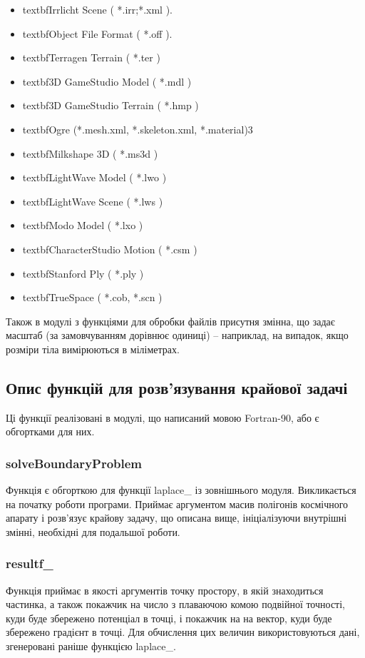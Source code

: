 \documentclass[a4paper,12pt]{article}
\begin{document}
\begin{itemize}
 \item textbf{Irrlicht Scene} ( *.irr;*.xml ).
 \item textbf{Object File Format} ( *.off ).
 \item textbf{Terragen Terrain} ( *.ter )
 \item textbf{3D GameStudio Model} ( *.mdl )
 \item textbf{3D GameStudio Terrain} ( *.hmp )
 \item textbf{Ogre} (*.mesh.xml, *.skeleton.xml, *.material)3
 \item textbf{Milkshape 3D} ( *.ms3d )
 \item textbf{LightWave Model} ( *.lwo )
 \item textbf{LightWave Scene} ( *.lws )
 \item textbf{Modo Model} ( *.lxo )
 \item textbf{CharacterStudio Motion} ( *.csm )
 \item textbf{Stanford Ply} ( *.ply )
 \item textbf{TrueSpace} ( *.cob, *.scn )
\end{itemize}

\bigskip

Також в модулі з функціями для обробки файлів присутня змінна, що задає масштаб (за замовчуванням дорівнює одиниці) -- наприклад, на випадок, якщо розміри тіла вимірюються в міліметрах.

\subsection{Опис функцій для розв’язування крайової задачі}
Ці функції реалізовані в модулі, що написаний мовою Fortran-90, або є обгортками для них.

\subsubsection{solveBoundaryProblem}
Функція є обгорткою для функції laplace\_ із зовнішнього модуля. Викликається на початку роботи програми. Приймає аргументом масив полігонів космічного апарату і розв’язує крайову задачу, що описана вище, ініціалізуючи внутрішні змінні, необхідні для подальшої роботи. 

\subsubsection{resultf\_}
Функція приймає в якості аргументів точку простору, в якій знаходиться частинка, а також покажчик на число з плаваючою комою подвійної точності, куди буде збережено потенціал в точці, і покажчик на на вектор, куди буде збережено градієнт в точці. Для обчислення цих величин використовуються дані, згенеровані раніше функцією laplace\_.
\end{document}
